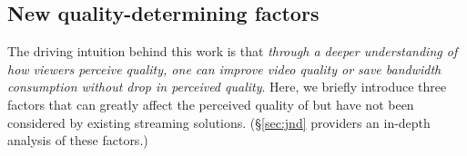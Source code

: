%

\subsection{New quality-determining factors}
\label{subsec:opportunities}

The driving intuition behind this work is that {\em through a deeper understanding of how viewers perceive \vrvideo quality, one can improve video quality or save bandwidth consumption without drop in perceived quality}.
Here, we briefly introduce three factors that can greatly affect the perceived quality of \vrvideos but have not been considered by existing \vrvideo streaming solutions. (\S\ref{sec:jnd} providers an in-depth analysis of these factors.)


